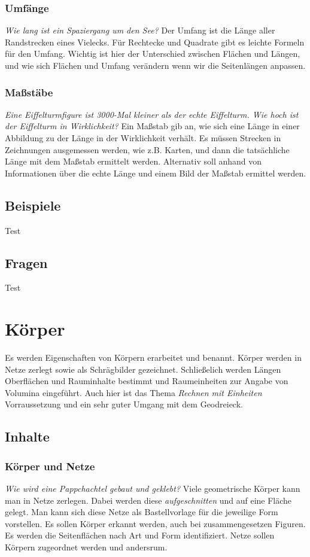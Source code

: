 \documentclass{article}
\begin{document}
\subsubsection*{Umfänge}
\textit{Wie lang ist ein Spaziergang um den See?}
Der Umfang ist die Länge aller Randstrecken eines Vielecks. Für Rechtecke und Quadrate gibt es leichte Formeln für den Umfang. Wichtig ist hier der Unterschied zwischen Flächen und Längen, und wie sich Flächen und Umfang verändern wenn wir die Seitenlängen anpassen.
\subsubsection*{Maßstäbe}
\textit{Eine Eiffelturmfigure ist 3000-Mal kleiner als der echte Eiffelturm. Wie hoch ist der Eiffelturm in Wirklichkeit?}
Ein Maßstab gib an, wie sich eine Länge in einer Abbildung zu der Länge in der Wirklichkeit verhält. Es müssen Strecken in Zeichnungen ausgemessen werden, wie z.B. Karten, und dann die tatsächliche Länge mit dem Maßstab ermittelt werden.
Alternativ soll anhand von Informationen über die echte Länge und einem Bild der Maßstab ermittel werden.
\subsection{Beispiele}
\begin{tcolorbox}[colback=gray!5!white,colframe=gray!25!black]
Test
\end{tcolorbox}
\subsection{Fragen}
\begin{tcolorbox}[colback=blue!5!white,colframe=blue!25!black]
Test
\end{tcolorbox}
\newpage
\section{Körper}
Es werden Eigenschaften von Körpern erarbeitet und benannt. Körper werden in Netze zerlegt sowie als Schrägbilder gezeichnet. Schließelich werden Längen Oberflächen und Rauminhalte bestimmt und Raumeinheiten zur Angabe von Volumina eingeführt.
Auch hier ist das Thema \textit{Rechnen mit Einheiten} Vorraussetzung und ein sehr guter Umgang mit dem Geodreieck.
\subsection{Inhalte}
\subsubsection*{ Körper und Netze}
\textit{Wie wird eine Pappchachtel gebaut und geklebt?}
Viele geometrische Körper kann man in Netze zerlegen. Dabei werden diese \textit{aufgeschnitten} und auf eine Fläche gelegt. Man kann sich diese Netze als Bastellvorlage für die jeweilige Form vorstellen.
Es sollen Körper erkannt werden, auch bei zusammengesetzen Figuren. Es werden die Seitenflächen nach Art und Form identifiziert. Netze sollen Körpern zugeordnet werden und andersrum. 
\end{document}

